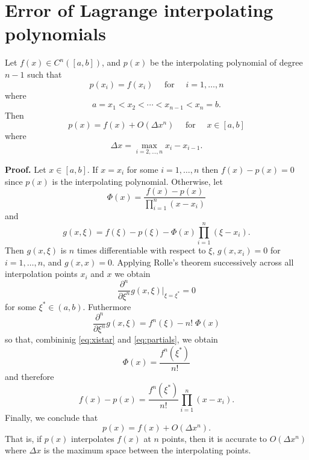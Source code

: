 \documentclass{article}
\newcommand{\for}[0]{\quad \text{ for } \quad}
\newcommand{\xlj}[0]{x_{j-1/2}}
\newcommand{\xrj}[0]{x_{j+1/2}}
\numberwithin{equation}{section}
\begin{document}




\newpage
\appendix
\section{Error of Lagrange interpolating polynomials}
\label{app:lagrange}

Let $f(x) \in C^{n}([a,b])$, and $p(x)$ be the interpolating
polynomial of degree $n-1$ such that
\begin{equation}
  p(x_i) = f(x_i) \for i=1,\ldots,n
\end{equation}
where
\begin{equation}
  a = x_1 < x_2 < \cdots < x_{n-1} < x_n = b.
\end{equation}
Then
\begin{equation}
  p(x) = f(x) + O(\Delta x^n) \for x \in [a,b]
\end{equation}
where
\begin{equation}
  \Delta x = \max_{i=2,\ldots,n} x_i - x_{i-1}.
\end{equation}

\textbf{Proof.}  Let $x \in [a,b]$.  If $x = x_i$ for some
$i=1,\ldots,n$ then $f(x) - p(x) = 0$ since $p(x)$ is the
interpolating polynomial.  Otherwise, let
\begin{equation}
  \Phi(x) = \frac{f(x) - p(x)}{\prod_{i=1}^n (x - x_i)}
\end{equation}
and
\begin{equation}
  g(x,\xi) = f(\xi) - p(\xi) - \Phi(x) \prod_{i=1}^n (\xi - x_i).
\end{equation}
Then $g(x,\xi)$ is $n$ times differentiable with respect to $\xi$,
$g(x,x_i) = 0$ for $i=1,\ldots,n$, and $g(x,x) = 0$.  Applying Rolle's
theorem successively across all interpolation points $x_i$ and $x$ we
obtain
\begin{equation}
  \label{eq:xistar}
  \frac{\partial^n}{\partial \xi^n} g(x,\xi)\biggr|_{\xi=\xi^*} = 0
\end{equation}
for some $\xi^* \in (a,b)$.  Futhermore
\begin{equation}
  \label{eq:partials}
  \frac{\partial^n}{\partial \xi^n} g(x,\xi) = f^n(\xi) - n!\;\Phi(x)
\end{equation}
so that, combininig \eqref{eq:xistar} and \eqref{eq:partials}, we obtain
\begin{equation}
  \Phi(x) = \frac{f^n(\xi^*)}{n!}
\end{equation}
and therefore
\begin{equation}
  f(x) - p(x) = \frac{f^n(\xi^*)}{n!} \prod_{i=1}^n (x - x_i).
\end{equation}
Finally, we conclude that
\begin{equation}
  p(x) = f(x) + O(\Delta x^n).
\end{equation}
That is, if $p(x)$ interpolates $f(x)$ at $n$ points, then it is
accurate to $O(\Delta x^n)$ where $\Delta x$ is the maximum space
between the interpolating points.
\end{document}
